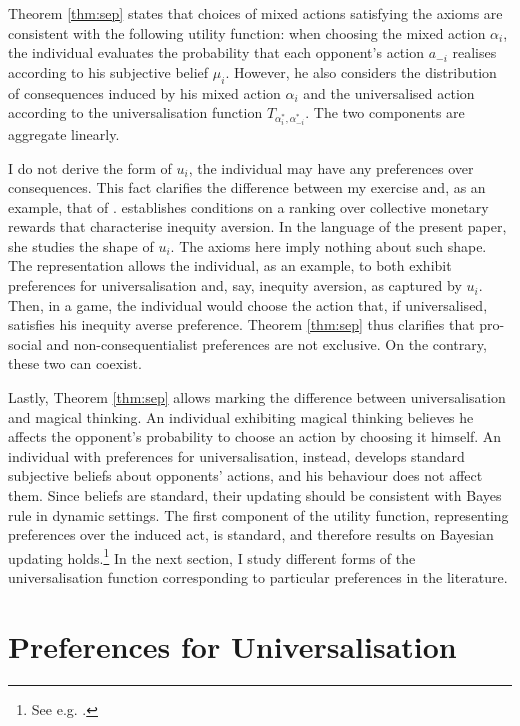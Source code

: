 Theorem \ref{thm:sep} states that choices of mixed actions satisfying the axioms are consistent with the following utility function: when choosing the mixed action \( \alpha_i \), the individual evaluates the probability that each opponent's action \( a_{-i} \) realises according to his subjective belief \( \mu_i \). However, he also considers the distribution of consequences induced by his mixed action \( \alpha_i \) and the universalised action according to the universalisation function \( T_{\alpha^{*}_i, \alpha^{*}_{-i}} \). The two components are aggregate linearly.

I do not derive the form of \( u_i \), the individual may have any preferences over consequences. This fact clarifies the difference between my exercise and, as an example, that of \cite{rohdePreferenceFoundationFehr2010}. \cite{rohdePreferenceFoundationFehr2010} establishes conditions on a ranking over collective monetary rewards that characterise inequity aversion. In the language of the present paper, she studies the shape of \( u_i \). The axioms here imply nothing about such shape. The representation allows the individual, as an example, to both exhibit preferences for universalisation and, say, inequity aversion, as captured by \( u_i \). Then, in a game, the individual would choose the action that, if universalised, satisfies his inequity averse preference. Theorem \ref{thm:sep} thus clarifies that pro-social and non-consequentialist preferences are not exclusive. On the contrary, these two can coexist.

Lastly, Theorem \ref{thm:sep} allows marking the difference between universalisation and magical thinking. An individual exhibiting magical thinking believes he affects the opponent's probability to choose an action by choosing it himself. An individual with preferences for universalisation, instead, develops standard subjective beliefs about opponents' actions, and his behaviour does not affect them. Since beliefs are standard, their updating should be consistent with Bayes rule in dynamic settings. The first component of the utility function, representing preferences over the induced act, is standard, and therefore results on Bayesian updating holds.\footnote{See e.g. \cite{epsteinRecursiveMultiplepriors2003,ghirardatoRevisitingSavageConditional2002}.} In the next section, I study different forms of the universalisation function corresponding to particular preferences in the literature.

\section{Preferences for Universalisation}\label{sec:applicationsuniv}

